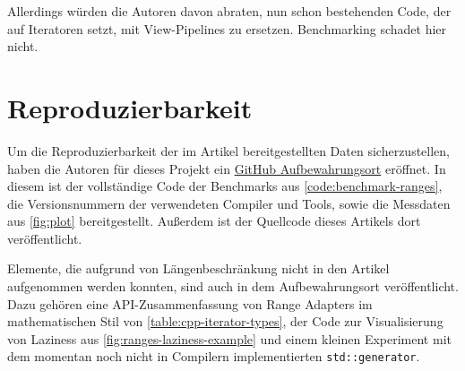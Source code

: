 \documentclass[runningheads]{llncs}
\begin{document}
Allerdings würden die Autoren davon abraten, nun schon bestehenden Code, der auf Iteratoren setzt, mit View-Pipelines zu ersetzen.
Benchmarking schadet hier nicht.


\section*{Reproduzierbarkeit}

Um die Reproduzierbarkeit der im Artikel bereitgestellten Daten sicherzustellen, haben die Autoren für dieses Projekt ein \href{https://github.com/becknik/SeminarModernCpp}{GitHub Aufbewahrungsort} eröffnet.
In diesem ist der vollständige Code der Benchmarks aus \autoref{code:benchmark-ranges}, die Versionsnummern der verwendeten Compiler und Tools, sowie die Messdaten aus \autoref{fig:plot} bereitgestellt.
Außerdem ist der Quellcode dieses Artikels dort veröffentlicht.

Elemente, die aufgrund von Längenbeschränkung nicht in den Artikel aufgenommen werden konnten, sind auch in dem Aufbewahrungsort veröffentlicht.
Dazu gehören eine API-Zusammenfassung von Range Adapters im mathematischen Stil von \autoref{table:cpp-iterator-types}, der Code zur Visualisierung von Laziness aus \autoref{fig:ranges-laziness-example} und einem kleinen Experiment mit dem momentan noch nicht in Compilern implementierten \texttt{std::generator}.

\newpage
\printbibliography
\end{document}
